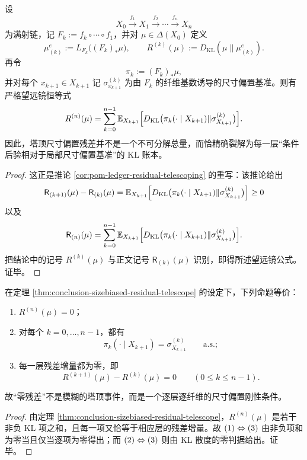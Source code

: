 \begin{theorem}[尺寸偏置残差的全塔望远镜分解]\label{thm:conclusion-sizebiased-residual-telescope}
设
\[
X_0\xrightarrow{f_1}X_1\xrightarrow{f_2}\cdots\xrightarrow{f_n}X_n
\]
为满射链，记 \(F_k:=f_k\circ\cdots\circ f_1\)，并对 \(\mu\in\Delta(X_0)\) 定义
\[
\mu_{(k)}^{e}:=L_{F_k}\bigl((F_k)_\ast\mu\bigr),
\qquad
R^{(k)}(\mu):=D_{\mathrm{KL}}(\mu\|\mu_{(k)}^{e}).
\]
再令
\[
\pi_k:=(F_k)_\ast\mu,
\]
并对每个 \(x_{k+1}\in X_{k+1}\) 记 \(\sigma^{(k)}_{x_{k+1}}\) 为由 \(F_k\) 的纤维基数诱导的尺寸偏置基准。则有严格望远镜恒等式
\[
R^{(n)}(\mu)
=
\sum_{k=0}^{n-1}
\mathbb E_{X_{k+1}}
\Bigl[
D_{\mathrm{KL}}\bigl(\pi_k(\cdot\mid X_{k+1})\|\sigma^{(k)}_{X_{k+1}}\bigr)
\Bigr].
\]
因此，塔顶尺寸偏置残差并不是一个不可分解总量，而恰精确裂解为每一层“条件后验相对于局部尺寸偏置基准”的 KL 账本。
\end{theorem}
\begin{proof}
这正是推论 \ref{cor:pom-ledger-residual-telescoping} 的重写：该推论给出
\[
\mathsf R_{(k+1)}(\mu)-\mathsf R_{(k)}(\mu)
=
\mathbb E_{X_{k+1}}
\Bigl[
D_{\mathrm{KL}}\bigl(\pi_k(\cdot\mid X_{k+1})\|\sigma^{(k)}_{X_{k+1}}\bigr)
\Bigr]\ge 0
\]
以及
\[
\mathsf R_{(n)}(\mu)
=
\sum_{k=0}^{n-1}
\mathbb E_{X_{k+1}}
\Bigl[
D_{\mathrm{KL}}\bigl(\pi_k(\cdot\mid X_{k+1})\|\sigma^{(k)}_{X_{k+1}}\bigr)
\Bigr].
\]
把结论中的记号 \(R^{(k)}(\mu)\) 与正文记号 \(\mathsf R_{(k)}(\mu)\) 识别，即得所述望远镜公式。证毕。
\end{proof}

\begin{corollary}[全塔零残差的逐层刚性判据]\label{cor:conclusion-zero-sizebiased-residual-layerwise-rigidity}
在定理 \ref{thm:conclusion-sizebiased-residual-telescope} 的设定下，下列命题等价：
\begin{enumerate}
  \item \(R^{(n)}(\mu)=0\)；
  \item 对每个 \(k=0,\dots,n-1\)，都有
  \[
  \pi_k(\cdot\mid X_{k+1})=\sigma^{(k)}_{X_{k+1}}
  \qquad\text{a.s.};
  \]
  \item 每一层残差增量都为零，即
  \[
  R^{(k+1)}(\mu)-R^{(k)}(\mu)=0
  \qquad (0\le k\le n-1).
  \]
\end{enumerate}
故“零残差”不是模糊的塔顶事件，而是一个逐层逐纤维的尺寸偏置刚性条件。
\end{corollary}
\begin{proof}
由定理 \ref{thm:conclusion-sizebiased-residual-telescope}，\(R^{(n)}(\mu)\) 是若干非负 KL 项之和，且每一项又恰等于相应层的残差增量。故 \(\textup{(1)}\Leftrightarrow\textup{(3)}\) 由非负项和为零当且仅当逐项为零得出；而 \(\textup{(2)}\Leftrightarrow\textup{(3)}\) 则由 KL 散度的零判据给出。证毕。
\end{proof}


